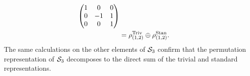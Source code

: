 {\begin{example}
\begin{align*}
\begin{pmatrix}
		 	1&0&0 \\ 0&-1&1 \\ 0&0&1
		 \end{pmatrix}\\
		 &= \rho_{(1,2)}^{\text{Triv}} \oplus \rho_{(1,2)}^{\text{Stan}}.
	\end{align*}
	The same calculations on the other elements of $\mathcal{S}_3$ confirm that the permutation representation of $\mathcal{S}_3$ decomposes to the direct sum of the trivial and standard representations.
\end{example}}